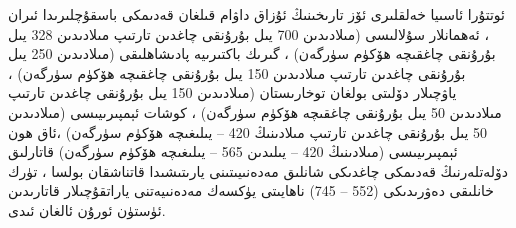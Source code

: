 \documentclass[a4paper]{article}
\begin{document}
ئوتتۇرا ئاسىيا خەلقلىرى ئۆز تارىخىنىڭ ئۇزاق داۋام قىلغان قەدىمكى باسقۇچلىرىدا ئىران ، ئەھمانلار سۇلالىسى (مىلادىدىن 700 يىل بۇرۇنقى چاغدىن تارتىپ مىلادىدىن 328 يىل بۇرۇنقى چاغقىچە ھۆكۈم سۈرگەن) ، گىرىك باكتىرىيە پادىشاھلىقى (مىلادىدىن 250 يىل بۇرۇنقى چاغدىن تارتىپ مىلادىدىن 150 يىل بۇرۇنقى چاغقىچە ھۆكۈم سۈرگەن) ، ياۋچىلار دۆلىتى بولغان توخارىستان (مىلادىدىن 150 يىل بۇرۇنقى چاغدىن تارتىپ مىلادىدىن 50 يىل بۇرۇنقى چاغقىچە ھۆكۈم سۈرگەن) ، كوشات ئېمپىرىيىسى (مىلادىدىن 50 يىل بۇرۇنقى چاغدىن تارتىپ مىلادىنىڭ 420 – يىلىغىچە ھۆكۈم سۈرگەن) ،ئاق ھون ئېمپىرىيىسى (مىلادىنىڭ 420 – يىلىدىن 565 – يىلىغىچە ھۆكۈم سۈرگەن) قاتارلىق دۆلەتلەرنىڭ قەدىمكى چاغدىكى شانلىق مەدەنىيىتىنى يارىتىشىدا قاتناشقان بولسا ، تۈرك خانلىقى دەۋرىدىكى (552 – 745) ناھايىتى يۈكسەك مەدەنىيەتنى ياراتقۇچىلار قاتارىدىن ئۈستۈن ئورۇن ئالغان ئىدى.
\end{document}
